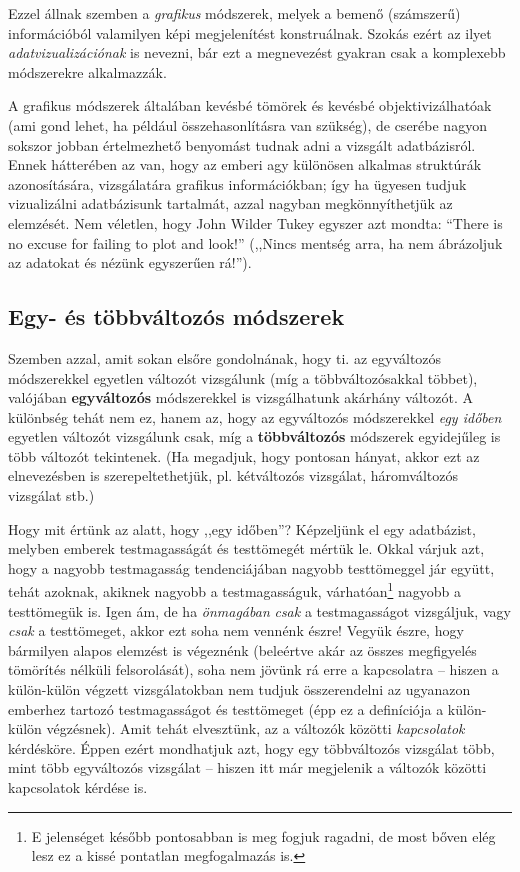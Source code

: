 \documentclass[
]{book}
\let\rmarkdownfootnote\footnote%
\def\footnote{\protect\rmarkdownfootnote}
\begin{document}
Ezzel állnak szemben a \emph{grafikus} módszerek, melyek a bemenő (számszerű) információból valamilyen képi megjelenítést konstruálnak. Szokás ezért az ilyet \emph{adatvizualizációnak} is nevezni, bár ezt a megnevezést gyakran csak a komplexebb módszerekre alkalmazzák.

A grafikus módszerek általában kevésbé tömörek és kevésbé objektivizálhatóak (ami gond lehet, ha például összehasonlításra van szükség), de cserébe nagyon sokszor jobban értelmezhető benyomást tudnak adni a vizsgált adatbázisról. Ennek hátterében az van, hogy az emberi agy különösen alkalmas struktúrák azonosítására, vizsgálatára grafikus információkban; így ha ügyesen tudjuk vizualizálni adatbázisunk tartalmát, azzal nagyban megkönnyíthetjük az elemzését. Nem véletlen, hogy John Wilder Tukey egyszer azt mondta: ``There is no excuse for failing to plot and look!'' (,,Nincs mentség arra, ha nem ábrázoljuk az adatokat és nézünk egyszerűen rá!'').

\hypertarget{deskriptivcsoportositasegytobbvalt}{%
\subsection{Egy- és többváltozós módszerek}\label{deskriptivcsoportositasegytobbvalt}}

Szemben azzal, amit sokan elsőre gondolnának, hogy ti. az egyváltozós módszerekkel egyetlen változót vizsgálunk (míg a többváltozósakkal többet), valójában \textbf{egyváltozós} módszerekkel is vizsgálhatunk akárhány változót. A különbség tehát nem ez, hanem az, hogy az egyváltozós módszerekkel \emph{egy időben} egyetlen változót vizsgálunk csak, míg a \textbf{többváltozós} módszerek egyidejűleg is több változót tekintenek. (Ha megadjuk, hogy pontosan hányat, akkor ezt az elnevezésben is szerepeltethetjük, pl. kétváltozós vizsgálat, háromváltozós vizsgálat stb.)

Hogy mit értünk az alatt, hogy ,,egy időben''? Képzeljünk el egy adatbázist, melyben emberek testmagasságát és testtömegét mértük le. Okkal várjuk azt, hogy a nagyobb testmagasság tendenciájában nagyobb testtömeggel jár együtt, tehát azoknak, akiknek nagyobb a testmagasságuk, várhatóan\footnote{E jelenséget később pontosabban is meg fogjuk ragadni, de most bőven elég lesz ez a kissé pontatlan megfogalmazás is.} nagyobb a testtömegük is. Igen ám, de ha \emph{önmagában} \emph{csak} a testmagasságot vizsgáljuk, vagy \emph{csak} a testtömeget, akkor ezt soha nem vennénk észre! Vegyük észre, hogy bármilyen alapos elemzést is végeznénk (beleértve akár az összes megfigyelés tömörítés nélküli felsorolását), soha nem jövünk rá erre a kapcsolatra -- hiszen a külön-külön végzett vizsgálatokban nem tudjuk összerendelni az ugyanazon emberhez tartozó testmagasságot és testtömeget (épp ez a definíciója a külön-külön végzésnek). Amit tehát elvesztünk, az a változók közötti \emph{kapcsolatok} kérdésköre. Éppen ezért mondhatjuk azt, hogy egy többváltozós vizsgálat több, mint több egyváltozós vizsgálat -- hiszen itt már megjelenik a változók közötti kapcsolatok kérdése is.
\end{document}
